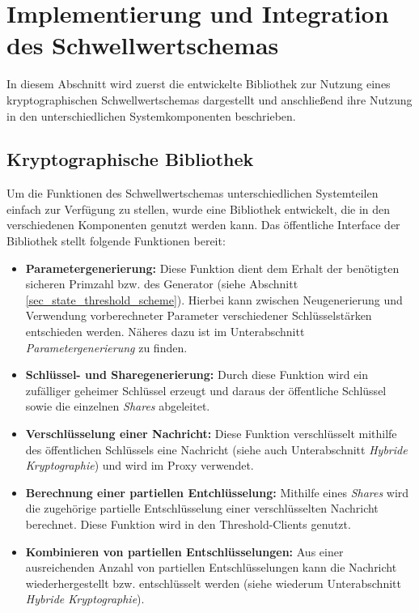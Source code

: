 \section{Implementierung und Integration des Schwellwertschemas}

\label{sec_impl_threshold}

In diesem Abschnitt wird zuerst die entwickelte Bibliothek zur Nutzung eines kryptographischen Schwellwertschemas dargestellt und anschließend ihre Nutzung in den unterschiedlichen Systemkomponenten beschrieben.

\subsection{Kryptographische Bibliothek}

%

Um die Funktionen des Schwellwertschemas unterschiedlichen Systemteilen einfach zur Verfügung zu stellen, wurde eine Bibliothek entwickelt, die in den verschiedenen Komponenten genutzt werden kann. Das öffentliche Interface der Bibliothek stellt folgende Funktionen bereit:

\begin{itemize}
  \item \textbf{Parametergenerierung: } Diese Funktion dient dem Erhalt der benötigten sicheren Primzahl bzw. des Generator (siehe Abschnitt \ref{sec_state_threshold_scheme}). Hierbei kann zwischen Neugenerierung und Verwendung vorberechneter Parameter verschiedener Schlüsselstärken entschieden werden. Näheres dazu ist im Unterabschnitt \textit{Parametergenerierung} zu finden.
  
  \item \textbf{Schlüssel- und Sharegenerierung: } Durch diese Funktion wird ein zufälliger geheimer Schlüssel erzeugt und daraus der öffentliche Schlüssel sowie die einzelnen \textit{Shares} abgeleitet. 
  
  \item \textbf{Verschlüsselung einer Nachricht: } Diese Funktion verschlüsselt mithilfe des öffentlichen Schlüssels eine Nachricht (siehe auch Unterabschnitt \textit{Hybride Kryptographie}) und wird im Proxy verwendet.
  
  \item \textbf{Berechnung einer partiellen Entchlüsselung: } Mithilfe eines \textit{Shares} wird die zugehörige partielle Entschlüsselung einer verschlüsselten Nachricht berechnet. Diese Funktion wird in den Threshold-Clients genutzt.
  
  \item \textbf{Kombinieren von partiellen Entschlüsselungen: } Aus einer ausreichenden Anzahl von partiellen Entschlüsselungen kann die Nachricht wiederhergestellt bzw. entschlüsselt werden (siehe wiederum Unterabschnitt \textit{Hybride Kryptographie}).
\end{itemize}

